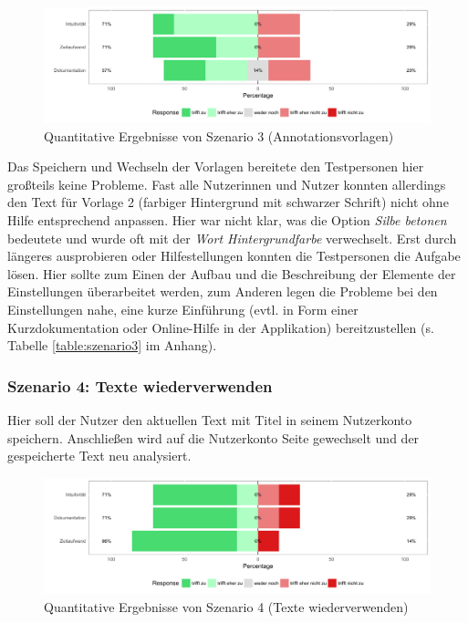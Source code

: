 \begin{figure}[h!]
	\centering
	\includegraphics[width=.8\linewidth]{figures/evaluation/scenario3}
	\caption{Quantitative Ergebnisse von Szenario 3 (Annotationsvorlagen)}
	\label{fig:evaluation-sc3}
\end{figure}

Das Speichern und Wechseln der Vorlagen bereitete den Testpersonen hier großteils keine Probleme. Fast alle Nutzerinnen und Nutzer konnten allerdings den Text für Vorlage 2 (farbiger Hintergrund mit schwarzer Schrift) nicht ohne Hilfe entsprechend anpassen. Hier war nicht klar, was die Option \textit{Silbe betonen} bedeutete und wurde oft mit der \textit{Wort Hintergrundfarbe} verwechselt. Erst durch längeres ausprobieren oder Hilfestellungen konnten die Testpersonen die Aufgabe lösen. Hier sollte zum Einen der Aufbau und die Beschreibung der Elemente der Einstellungen überarbeitet werden, zum Anderen legen die Probleme bei den Einstellungen nahe, eine kurze Einführung (evtl. in Form einer Kurzdokumentation oder Online-Hilfe in der Applikation) bereitzustellen (s. Tabelle \ref{table:szenario3} im Anhang).

\subsubsection{Szenario 4: Texte wiederverwenden}

Hier soll der Nutzer den aktuellen Text mit Titel in seinem Nutzerkonto speichern. Anschließen wird auf die Nutzerkonto Seite gewechselt und der gespeicherte Text neu analysiert.

\begin{figure}[h!]
	\centering
	\includegraphics[width=.8\linewidth]{figures/evaluation/scenario4}
	\caption{Quantitative Ergebnisse von Szenario 4 (Texte wiederverwenden)}
	\label{fig:evaluation-sc4}
\end{figure}

